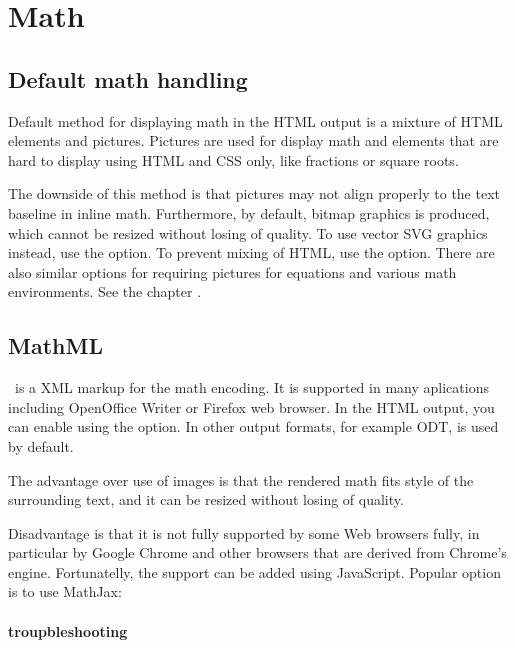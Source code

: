 \section{Math}
\subsection{Default math handling}

Default method for displaying math in the HTML output is a mixture of HTML elements and pictures. Pictures
are used for display math and elements that are hard to display using HTML and CSS only, like fractions or square roots.

The downside of this method is that pictures may not align properly to the text baseline in inline math. Furthermore, by default,
bitmap graphics is produced, which cannot be resized without losing of quality. To use vector SVG graphics instead, use the  
option. To prevent mixing of HTML, use the  option. There are also similar options for requiring pictures for equations
and various math environments. See the chapter .


\subsection{MathML}

\mathml\ is a XML markup for the math encoding. 
It is supported in many aplications including OpenOffice Writer or Firefox web browser. 
In the HTML output, you can enable \mathml{} using the  option. In other output formats,
for example ODT, \mathml{} is used by default.

The advantage over use of images is that the rendered math fits style of the surrounding text,
and it can be resized without losing of quality.

Disadvantage is that it is not fully supported by some Web browsers fully, in particular
by Google Chrome and other browsers that are derived from Chrome's engine. Fortunatelly,
the support can be added using JavaScript. Popular option is to use MathJax:


\paragraph{\mathml{} troupbleshooting}

